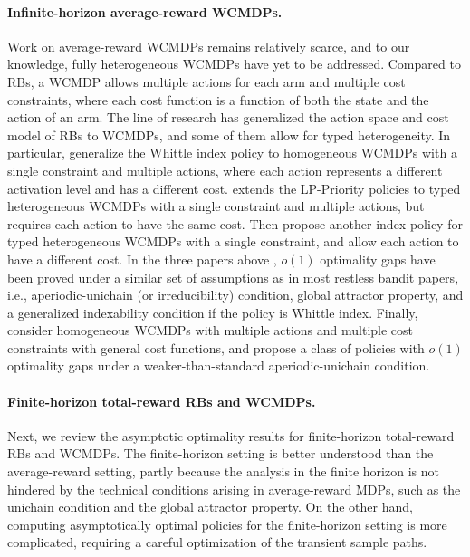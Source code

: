 \documentclass{article}
\theoremstyle{plain}
\theoremstyle{remark}
\begin{document}
\paragraph{Infinite-horizon average-reward WCMDPs.}
Work on average-reward WCMDPs remains relatively scarce, and to our knowledge, fully heterogeneous WCMDPs have yet to be addressed. 
Compared to RBs, a WCMDP allows multiple actions for each arm and multiple cost constraints, where each cost function is a function of both the state and the action of an arm.
The line of research \cite{HodGla_15,Ver_16_verloop,XioWanLi_22,GolAvr_24_wcmdp_multichain} has generalized the action space and cost model of RBs to WCMDPs, and some of them allow for typed heterogeneity.
In particular, \citet{HodGla_15} generalize the Whittle index policy to homogeneous WCMDPs with a single constraint and multiple actions, where each action represents a different activation level and has a different cost.
\citet{Ver_16_verloop} extends the LP-Priority policies to typed heterogeneous WCMDPs with a single constraint and multiple actions, but requires each action to have the same cost.
Then \citet{XioWanLi_22} propose another index policy for typed heterogeneous WCMDPs with a single constraint, and allow each action to have a different cost.
In the three papers above \citep{HodGla_15,Ver_16_verloop,XioWanLi_22}, $o(1)$ optimality gaps have been proved under a similar set of assumptions as in most restless bandit papers, i.e., aperiodic-unichain (or irreducibility) condition, global attractor property, and a generalized indexability condition if the policy is Whittle index.
Finally, \citet{GolAvr_24_wcmdp_multichain} consider homogeneous WCMDPs with multiple actions and multiple cost constraints with general cost functions,
and propose a class of policies with $o(1)$ optimality gaps under a weaker-than-standard aperiodic-unichain condition.





\paragraph{Finite-horizon total-reward RBs and WCMDPs.}
Next, we review the asymptotic optimality results for finite-horizon total-reward RBs and WCMDPs. The finite-horizon setting is better understood than the average-reward setting, partly because the analysis in the finite horizon is not hindered by the technical conditions arising in average-reward MDPs, such as the unichain condition and the global attractor property. On the other hand, computing asymptotically optimal policies for the finite-horizon setting is more complicated, requiring a careful optimization of the transient sample paths.
\end{document}
